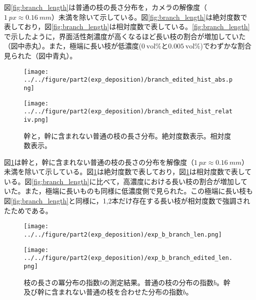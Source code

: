 \documentclass[autodetect-engine,dvi=dvipdfmx,a4paper,ja=standard,oneside,openany,11pt]{bxjsbook}
\begin{document}
図\ref{fig:branch_length}は普通の枝の長さ分布を，カメラの解像度（$\SI{1}{px}\approx \SI{0.16}{mm}$）未満を除いて示している。図\ref{fig:branch_length}は絶対度数で表しており，図\ref{fig:branch_length}は相対度数で表している。\ref{fig:branch_length}で示したように，界面活性剤濃度が高くなるほど長い枝の割合が増加していた（図中赤丸）。また，極端に長い枝が低濃度($\SI{0}{\mathrm{vol}\%}$と$\SI{0.005}{\mathrm{vol}\%}$)でわずかな割合見られた（図中青丸）。

\begin{figure}[htbp]
  \begin{minipage}
    {0.45\textwidth}
    \subcaption{}
    \centering
    \texttt{[image: ../../figure/part2(exp\_deposition)/branch\_edited\_hist\_abs.png]}
    \label{fig:branch_length_absolute_edited}
  \end{minipage}
  \begin{minipage}
    {0.45\textwidth}
    \subcaption{}
    \centering
    \texttt{[image: ../../figure/part2(exp\_deposition)/branch\_edited\_hist\_relativ.png]}
    \label{fig:branch_length_relativ_edited}
  \end{minipage}
  \caption{幹と，幹に含まれない普通の枝の長さ分布。絶対度数表示。相対度数表示。}
  \label{fig:branch_length_edited}
\end{figure}

図\ref{fig:branch_length_edited}は幹と，幹に含まれない普通の枝の長さの分布を解像度（$\SI{1}{px}\approx \SI{0.16}{mm}$）未満を除いて示している。図\ref{fig:branch_length_edited}は絶対度数で表しており，図\ref{fig:branch_length_edited}は相対度数で表している。図\ref{fig:branch_length}に比べて，高濃度における長い枝の割合が増加していた。また，極端に長いものも同様に低濃度側で見られた。この極端に長い枝も図\ref{fig:branch_length}と同様に，1,2本だけ存在する長い枝が相対度数で強調されたためである。

\begin{figure}[htbp]
  \begin{minipage}
    {0.51\textwidth}
    \subcaption{}
    \centering
    \texttt{[image: ../../figure/part2(exp\_deposition)/exp\_b\_branch\_len.png]}
    \label{fig:exp_b_branch_len}
  \end{minipage}
  \begin{minipage}
    {0.49\textwidth}
    \subcaption{}
    \centering
    \texttt{[image: ../../figure/part2(exp\_deposition)/exp\_b\_branch\_edited\_len.png]}
    \label{fig:exp_b_branch_edited_len}
  \end{minipage}
  \caption{枝の長さの冪分布の指数$b$の測定結果。普通の枝の分布の指数$b$。幹及び幹に含まれない普通の枝を合わせた分布の指数$b$。}
  \label{fig:branch_length_exp}
\end{figure}
\end{document}
